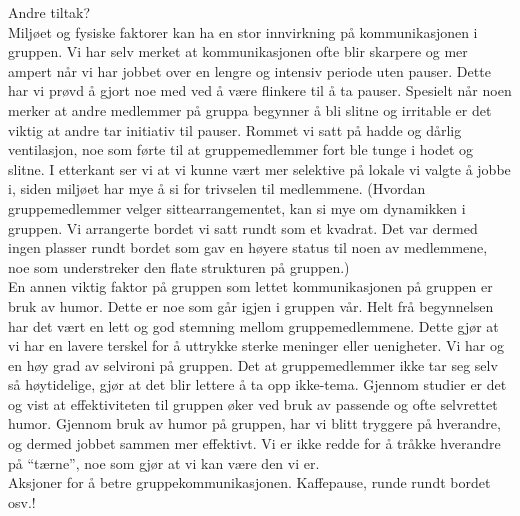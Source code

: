 Andre tiltak?\\

Miljøet og fysiske faktorer kan ha en stor innvirkning på kommunikasjonen i gruppen. Vi har selv merket at kommunikasjonen ofte blir skarpere og mer ampert når vi har jobbet over en lengre og intensiv periode uten pauser. Dette har vi prøvd å gjort noe med ved å være flinkere til å ta pauser. Spesielt når noen merker at andre medlemmer på gruppa begynner å bli slitne og irritable er det viktig at andre tar initiativ til pauser. Rommet vi satt på hadde og dårlig ventilasjon, noe som førte til at gruppemedlemmer fort ble tunge i hodet og slitne. I etterkant ser vi at vi kunne vært mer selektive på lokale vi valgte å jobbe i, siden miljøet har mye å si for trivselen til medlemmene.
(Hvordan gruppemedlemmer velger sittearrangementet, kan si mye om dynamikken i gruppen. Vi arrangerte bordet vi satt rundt som et kvadrat. Det var dermed ingen plasser rundt bordet som gav en høyere status til noen av medlemmene, noe som understreker den flate strukturen på gruppen.)\\

En annen viktig faktor på gruppen som lettet kommunikasjonen på gruppen er bruk av humor. Dette er noe som går igjen i gruppen vår. Helt frå begynnelsen har det vært en lett og god stemning mellom gruppemedlemmene. Dette gjør at vi har en lavere terskel for å uttrykke sterke meninger eller uenigheter. Vi har og en høy grad av selvironi på gruppen. Det at gruppemedlemmer ikke tar seg selv så høytidelige, gjør at det blir lettere å ta opp ikke-tema. Gjennom studier er det og vist at effektiviteten til gruppen øker ved bruk av passende og ofte selvrettet humor. Gjennom bruk av humor på gruppen, har vi blitt tryggere på hverandre, og dermed jobbet sammen mer effektivt. Vi er ikke redde for å tråkke hverandre på ``tærne'', noe som gjør at vi kan være den vi er. \\

Aksjoner for å betre gruppekommunikasjonen. Kaffepause, runde rundt bordet osv.!\\

